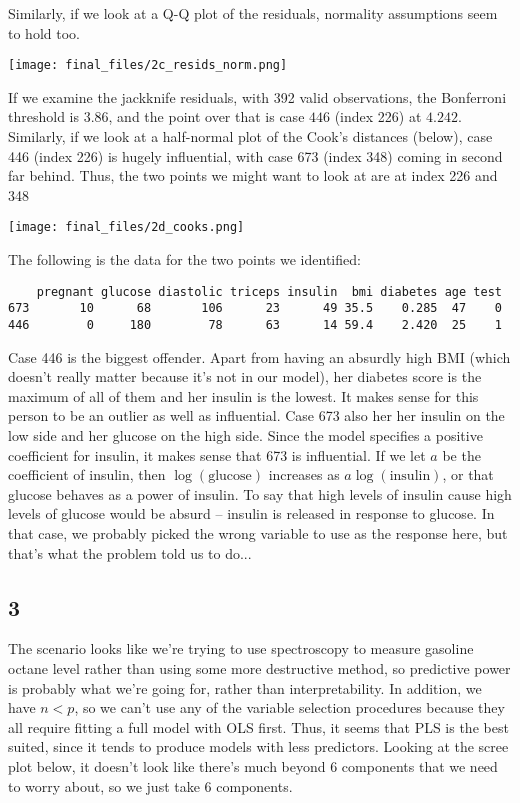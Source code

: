 \documentclass{article}
\begin{document}
Similarly, if we look at a Q-Q plot of the residuals, normality assumptions seem to hold too.

\texttt{[image: final\_files/2c\_resids\_norm.png]}

If we examine the jackknife residuals, with 392 valid observations, the Bonferroni threshold is $3.86$, and the point over that is case $446$ (index 226) at $4.242$. Similarly, if we look at a half-normal plot of the Cook's distances (below), case 446 (index 226) is hugely influential, with case 673 (index 348) coming in second far behind. Thus, the two points we might want to look at are at index 226 and 348

\texttt{[image: final\_files/2d\_cooks.png]}

The following is the data for the two points we identified:
\begin{verbatim}
    pregnant glucose diastolic triceps insulin  bmi diabetes age test
673       10      68       106      23      49 35.5    0.285  47    0
446        0     180        78      63      14 59.4    2.420  25    1
\end{verbatim}
Case 446 is the biggest offender. Apart from having an absurdly high BMI (which doesn't really matter because it's not in our model), her diabetes score is the maximum of all of them and her insulin is the lowest. It makes sense for this person to be an outlier as well as influential. Case 673 also her her insulin on the low side and her glucose on the high side. Since the model specifies a positive coefficient for insulin, it makes sense that 673 is influential.
If we let $a$ be the coefficient of insulin, then $\log(\text{glucose})$ increases as $a\log(\text{insulin})$, or that glucose behaves as a power of insulin. To say that high levels of insulin cause high levels of glucose would be absurd -- insulin is released in response to glucose. In that case, we probably picked the wrong variable to use as the response here, but that's what the problem told us to do...
\subsection*{3}
The scenario looks like we're trying to use spectroscopy to measure gasoline octane level rather than using some more destructive method, so predictive power is probably what we're going for, rather than interpretability. In addition, we have $n<p$, so we can't use any of the variable selection procedures because they all require fitting a full model with OLS first. Thus, it seems that PLS is the best suited, since it tends to produce models with less predictors.
Looking at the scree plot below, it doesn't look like there's much beyond $6$ components that we need to worry about, so we just take $6$ components.
\end{document}

